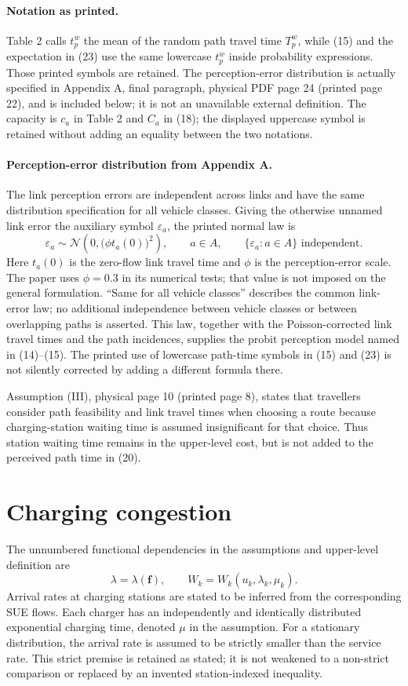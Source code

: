 \documentclass{article}
\begin{document}
\paragraph{Notation as printed.}
Table 2 calls $t_p^w$ the mean of the random path travel time $T_p^w$, while (15) and the expectation in (23) use the same lowercase $t_p^w$ inside probability expressions. Those printed symbols are retained. The perception-error distribution is actually specified in Appendix A, final paragraph, physical PDF page 24 (printed page 22), and is included below; it is not an unavailable external definition. The capacity is $c_a$ in Table 2 and $C_a$ in (18); the displayed uppercase symbol is retained without adding an equality between the two notations.

\paragraph{Perception-error distribution from Appendix A.}
The link perception errors are independent across links and have the same distribution specification for all vehicle classes. Giving the otherwise unnamed link error the auxiliary symbol $\varepsilon_a$, the printed normal law is
\[
\varepsilon_a\sim\mathcal N\!\left(0,\bigl(\phi t_a(0)\bigr)^2\right),
\qquad a\in A,
\qquad \{\varepsilon_a:a\in A\}\text{ independent}.
\]
Here $t_a(0)$ is the zero-flow link travel time and $\phi$ is the perception-error scale. The paper uses $\phi=0.3$ in its numerical tests; that value is not imposed on the general formulation. ``Same for all vehicle classes'' describes the common link-error law; no additional independence between vehicle classes or between overlapping paths is asserted. This law, together with the Poisson-corrected link travel times and the path incidences, supplies the probit perception model named in (14)--(15). The printed use of lowercase path-time symbols in (15) and (23) is not silently corrected by adding a different formula there.

Assumption (III), physical page 10 (printed page 8), states that travellers consider path feasibility and link travel times when choosing a route because charging-station waiting time is assumed insignificant for that choice. Thus station waiting time remains in the upper-level cost, but is not added to the perceived path time in (20).

\section*{Charging congestion}
The unnumbered functional dependencies in the assumptions and upper-level definition are
\[
\lambda=\lambda(\mathbf f),\qquad
W_k=W_k(u_k,\lambda_k,\mu_k).
\]
Arrival rates at charging stations are stated to be inferred from the corresponding SUE flows. Each charger has an independently and identically distributed exponential charging time, denoted $\mu$ in the assumption. For a stationary distribution, the arrival rate is assumed to be strictly smaller than the service rate. This strict premise is retained as stated; it is not weakened to a non-strict comparison or replaced by an invented station-indexed inequality.
\end{document}
